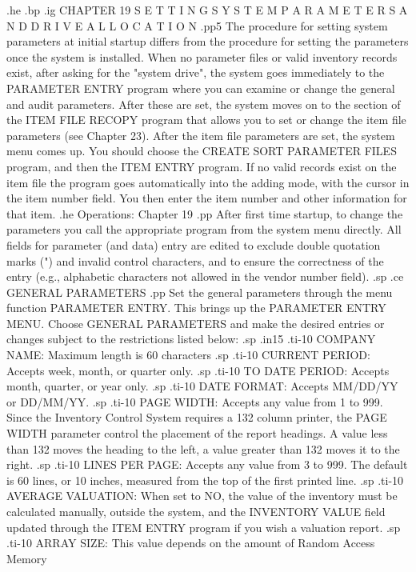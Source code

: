 .he
.bp
.ig
CHAPTER 19
S E T T I N G	S Y S T E M   P A R A M E T E R S
A N D	D R I V E   A L L O C A T I O N
.pp5
The procedure for setting system parameters at initial startup differs
from the procedure for setting the parameters once the system is installed.
When no parameter files or valid inventory records exist, after asking for
the "system drive", the system goes immediately to the PARAMETER ENTRY
program where you can examine or change
the general and audit parameters.  After
these are set, the system moves on to the section of the ITEM FILE RECOPY
program that allows you to set or change the item file parameters (see
Chapter 23). After the item file parameters are set, the system menu
comes up.  You should choose the CREATE SORT PARAMETER FILES program, and
then the ITEM ENTRY program.  If no valid records exist on the item file
the program goes automatically into the adding mode, with the cursor in the
item number field. You then enter the item number
and other information for that item.
.he Operations: Chapter 19
.pp
After first time startup, to change the parameters
you call the appropriate program from the system menu directly.
All fields for parameter (and data) entry are edited to exclude double
quotation marks (") and invalid
control characters, and to ensure the correctness
of the entry (e.g., alphabetic characters not allowed in the vendor number
field).
.sp
.ce
GENERAL PARAMETERS
.pp
Set the general parameters through the menu function PARAMETER ENTRY.  This
brings up the PARAMETER ENTRY MENU.  Choose GENERAL PARAMETERS and make
the desired entries or changes subject to the restrictions listed below:
.sp
.in15
.ti-10
COMPANY NAME:  Maximum length is 60 characters
.sp
.ti-10
CURRENT PERIOD:  Accepts week, month, or quarter only.
.sp
.ti-10
TO DATE PERIOD:  Accepts month, quarter, or year only.
.sp
.ti-10
DATE FORMAT:  Accepts MM/DD/YY or DD/MM/YY.
.sp
.ti-10
PAGE WIDTH:  Accepts any value from 1 to 999.  Since the Inventory
Control System requires a 132 column printer, the PAGE WIDTH parameter
control the placement of the report headings.  A value less than 132
moves the heading to the left, a value greater than 132 moves it to
the right.
.sp
.ti-10
LINES PER PAGE:  Accepts any value from 3 to 999.  The default is 60
lines, or 10 inches, measured from the top of the first printed line.
.sp
.ti-10
AVERAGE VALUATION:  When set to NO, the value of the inventory must be
calculated manually, outside the system, and the INVENTORY VALUE field
updated through the ITEM ENTRY program if you wish a valuation report.
.sp
.ti-10
ARRAY SIZE:  This value depends on the amount of Random Access Memory
